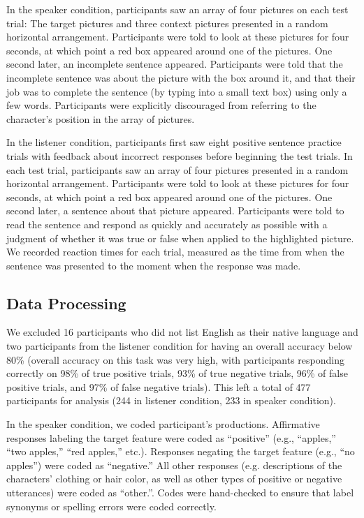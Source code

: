 \documentclass[man, noapacite]{apa2}
\begin{document}
In the speaker condition, participants saw an array of four pictures on each test trial: The target pictures and three context pictures presented in a random horizontal arrangement.  Participants were told to look at these pictures for four seconds, at which point a red box appeared around one of the pictures.  One second later, an incomplete sentence appeared.  Participants were told that the incomplete sentence was about the picture with the box around it, and that their job was to complete the sentence (by typing into a small text box) using only a few words. Participants were explicitly discouraged from referring to the character's position in the array of pictures. 

In the listener condition, participants first saw eight positive sentence practice trials with feedback about incorrect responses before beginning the test trials. In each test trial, participants saw an array of four pictures presented in a random horizontal arrangement.  Participants were told to look at these pictures for four seconds, at which point a red box appeared around one of the pictures.  One second later, a sentence about that picture appeared.  Participants were told to read the sentence and respond as quickly and accurately as possible with a judgment of whether it was true or false when applied to the highlighted picture.  We recorded reaction times for each trial, measured as the time from when the sentence was presented to the moment when the response was made.
  
\subsection{Data Processing} 
  
We excluded 16 participants who did not list English as their native language and two participants from the listener condition for having an overall accuracy below 80\% (overall accuracy on this task was very high, with participants responding correctly on 98\% of true positive trials, 93\% of true negative trials, 96\% of false positive trials, and 97\% of false negative trials). This left a total of 477 participants for analysis (244 in listener condition, 233 in speaker condition). 

In the speaker condition, we coded participant's productions. Affirmative responses labeling the target feature were coded as ``positive'' (e.g., ``apples,'' ``two apples,'' ``red apples,'' etc.).  Responses negating the target feature (e.g., ``no apples'') were coded as ``negative.''  All other responses (e.g. descriptions of the characters' clothing or hair color, as well as other types of positive or negative utterances) were coded as ``other.''.   Codes were hand-checked to ensure that label synonyms or spelling errors were coded correctly.
\end{document}
